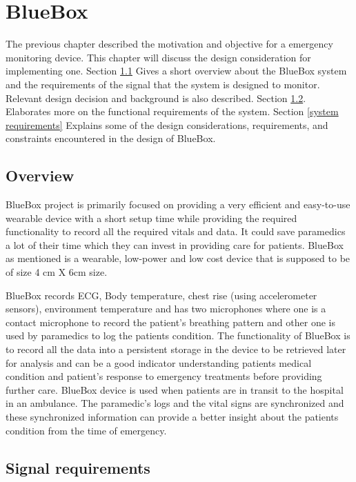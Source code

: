 \chapter{BlueBox }

The previous chapter described the motivation and objective for a emergency monitoring device. This chapter will discuss the design consideration for implementing one. 
Section \ref{overview} Gives a short overview about the BlueBox system and the requirements of the signal that the system is designed to monitor. Relevant design decision and background is also described. 
Section \ref{signal requirements}. Elaborates more on the functional requirements of the system. 
Section \ref{system requirements} Explains some of the design considerations, requirements, and constraints encountered in the design of BlueBox.

\section{Overview}\label{overview}

BlueBox project is primarily focused on providing a very efficient and easy-to-use wearable device with a short setup time while providing the required functionality to record all the required vitals and data. It could save paramedics a lot of their time which they can invest in providing care for patients. BlueBox as mentioned is a wearable, low-power and low cost device that is supposed to be of size 4 cm X 6cm size.

BlueBox records ECG, Body temperature, chest rise (using accelerometer sensors), environment temperature and has two microphones where one is a contact microphone to record the patient's breathing pattern and other one is used by paramedics to log the patients condition. The functionality of BlueBox is to record all the data into a persistent storage in the device to be retrieved later for analysis and can be a good indicator understanding patients medical condition and patient's response to emergency treatments before providing further care. BlueBox device is used when patients are in transit to the hospital in an ambulance. The paramedic's logs and the vital signs are synchronized and these synchronized information can provide a better insight about the patients condition from the time of emergency. 
\section{Signal requirements}\label{signal requirements}
